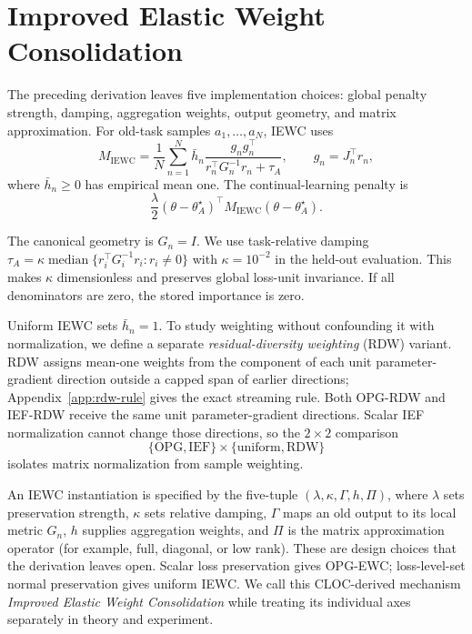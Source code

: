 \section{Improved Elastic Weight Consolidation}

The preceding derivation leaves five implementation choices: global penalty strength, damping, aggregation weights, output geometry, and matrix approximation. For old-task samples $a_1,\dots,a_N$, IEWC uses
\[
M_{\mathrm{IEWC}}
=
\frac1N
\sum_{n=1}^N
\bar h_n
\frac{g_ng_n^\top}{r_n^\top G_n^{-1}r_n+\tau_A},
\qquad
g_n=J_n^\top r_n,
\]
where $\bar h_n\ge0$ has empirical mean one. The continual-learning penalty is
\[
\frac{\lambda}{2}
(\theta-\theta_A^\star)^\top
M_{\mathrm{IEWC}}
(\theta-\theta_A^\star).
\]

The canonical geometry is $G_n=I$. We use task-relative damping $\tau_A=\kappa\operatorname{median}\{r_i^\top G_i^{-1}r_i:r_i\ne0\}$ with $\kappa=10^{-2}$ in the held-out evaluation. This makes $\kappa$ dimensionless and preserves global loss-unit invariance. If all denominators are zero, the stored importance is zero.

Uniform IEWC sets $\bar h_n=1$. To study weighting without confounding it with normalization, we define a separate \emph{residual-diversity weighting} (RDW) variant. RDW assigns mean-one weights from the component of each unit parameter-gradient direction outside a capped span of earlier directions; Appendix~\ref{app:rdw-rule} gives the exact streaming rule. Both OPG-RDW and IEF-RDW receive the same unit parameter-gradient directions. Scalar IEF normalization cannot change those directions, so the $2\times2$ comparison
\[
\{\mathrm{OPG},\mathrm{IEF}\}
\times
\{\mathrm{uniform},\mathrm{RDW}\}
\]
isolates matrix normalization from sample weighting.

An IEWC instantiation is specified by the five-tuple $(\lambda,\kappa,\Gamma,h,\Pi)$, where $\lambda$ sets preservation strength, $\kappa$ sets relative damping, $\Gamma$ maps an old output to its local metric $G_n$, $h$ supplies aggregation weights, and $\Pi$ is the matrix approximation operator (for example, full, diagonal, or low rank). These are design choices that the derivation leaves open. Scalar loss preservation gives OPG-EWC; loss-level-set normal preservation gives uniform IEWC. We call this CLOC-derived mechanism \emph{Improved Elastic Weight Consolidation} while treating its individual axes separately in theory and experiment.
